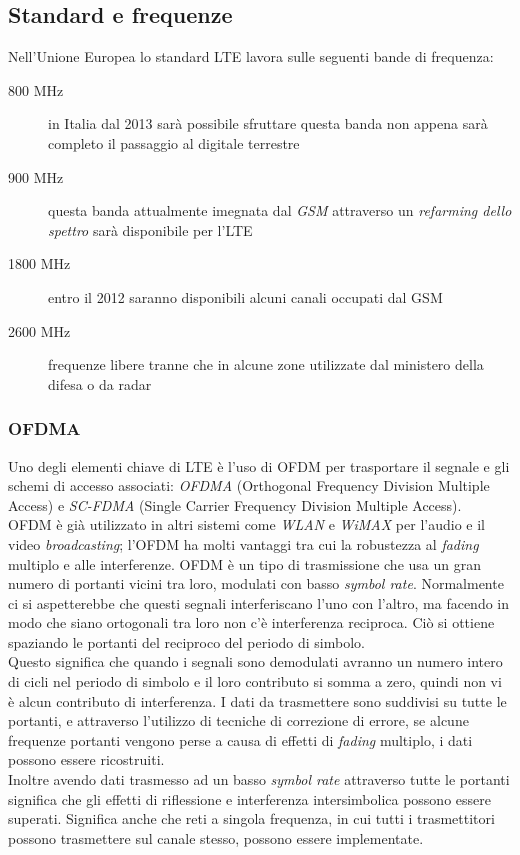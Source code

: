  \subsection{Standard e frequenze}
 Nell'Unione Europea lo standard \ac{LTE} lavora sulle seguenti bande di frequenza:
 \begin{description}
  \item[800 MHz] in Italia dal 2013 sarà possibile sfruttare questa banda non appena sarà completo il passaggio al digitale terrestre
  \item[900 MHz] questa banda attualmente imegnata dal \emph{GSM} attraverso un \emph{refarming dello spettro} sarà disponibile per 
		  l'\ac{LTE}
  \item[1800 MHz] entro il 2012 saranno disponibili alcuni canali occupati dal GSM
  \item[2600 MHz] frequenze libere tranne che in alcune zone utilizzate dal ministero della difesa o da radar
 \end{description}
 
\subsubsection{OFDMA}
Uno degli elementi chiave di \ac{LTE} è l'uso di \ac{OFDM} per trasportare il segnale e gli schemi di accesso associati: \emph{OFDMA} 
(Orthogonal Frequency Division Multiple Access) e \emph{SC-FDMA} (Single Carrier Frequency Division Multiple Access). \\
\ac{OFDM} è già utilizzato in altri sistemi come \emph{WLAN} e \emph{WiMAX} per l'audio e il video \emph{broadcasting}; l'\ac{OFDM} ha
molti vantaggi tra cui la robustezza al \emph{fading} multiplo e alle interferenze.
\ac{OFDM} è un tipo di trasmissione che usa un gran numero di portanti vicini tra loro, modulati con basso \emph{symbol rate}. Normalmente 
ci si aspetterebbe che questi segnali interferiscano l'uno con l'altro, ma facendo in modo che siano ortogonali tra loro non c'è 
interferenza reciproca. Ciò si ottiene spaziando le portanti del reciproco del periodo di simbolo. \\
Questo significa che quando i segnali sono demodulati avranno un numero intero di cicli nel periodo di simbolo e il loro contributo si 
somma a zero, quindi non vi è alcun contributo di interferenza. 
I dati da trasmettere sono suddivisi su tutte le portanti, e attraverso l'utilizzo di tecniche di correzione di errore, se alcune 
frequenze portanti vengono perse a causa di effetti di \emph{fading} multiplo, i dati possono essere ricostruiti.  \\
Inoltre avendo dati trasmesso ad un basso \emph{symbol rate} attraverso tutte le portanti significa che gli effetti di riflessione e 
interferenza intersimbolica possono essere superati. Significa anche che reti a singola frequenza, in cui tutti i trasmettitori possono
trasmettere sul canale stesso, possono essere implementate.

